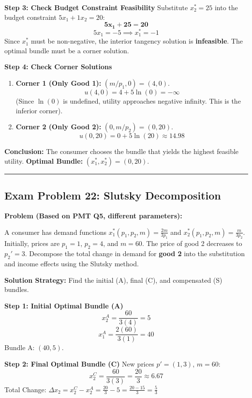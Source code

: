 \documentclass{article}
\begin{document}
\textbf{Step 3: Check Budget Constraint Feasibility}
Substitute $x_2^*=25$ into the budget constraint $5x_1 + 1x_2 = 20$:
\[ \boldsymbol{5x_1 + 25 = 20} \]
\[ 5x_1 = -5 \implies x_1^* = -1 \]
Since $x_1^*$ must be non-negative, the interior tangency solution is \textbf{infeasible}. The optimal bundle must be a corner solution.

\textbf{Step 4: Check Corner Solutions}
\begin{enumerate}
    \item \textbf{Corner 1 (Only Good 1):} $(m/p_1, 0) = (4, 0)$.
    \[ u(4, 0) = 4 + 5 \ln(0) = -\infty \]
    (Since $\ln(0)$ is undefined, utility approaches negative infinity. This is the inferior corner).

    \item \textbf{Corner 2 (Only Good 2):} $(0, m/p_2) = (0, 20)$.
    \[ u(0, 20) = 0 + 5 \ln(20) \approx 14.98 \]
\end{enumerate}

\textbf{Conclusion:} The consumer chooses the bundle that yields the highest feasible utility. \textbf{Optimal Bundle:} $(x_1^*, x_2^*) = (0, 20)$.

\bigskip\noindent\rule{\linewidth}{0.4pt}\bigskip

\subsection*{\textbf{Exam Problem 22: Slutsky Decomposition}}

\textbf{Problem (Based on PMT Q5, different parameters):}

A consumer has demand functions $x_1^*(p_1, p_2, m) = \frac{2m}{3p_1}$ and $x_2^*(p_1, p_2, m) = \frac{m}{3p_2}$. Initially, prices are $p_1=1$, $p_2=4$, and $m=60$. The price of good 2 decreases to $p_2'=3$. Decompose the total change in demand for \textbf{good 2} into the substitution and income effects using the Slutsky method.

\textbf{Solution Strategy:} Find the initial (A), final (C), and compensated (S) bundles.

\textbf{Step 1: Initial Optimal Bundle (A)}
\[ x_2^A = \frac{60}{3(4)} = 5 \]
\[ x_1^A = \frac{2(60)}{3(1)} = 40 \]
Bundle A: $(40, 5)$.

\textbf{Step 2: Final Optimal Bundle (C)}
New prices $p'=(1, 3)$, $m=60$:
\[ x_2^C = \frac{60}{3(3)} = \frac{20}{3} \approx 6.67 \]
Total Change: $\Delta x_2 = x_2^C - x_2^A = \frac{20}{3} - 5 = \frac{20 - 15}{3} = \frac{5}{3}$
\end{document}
